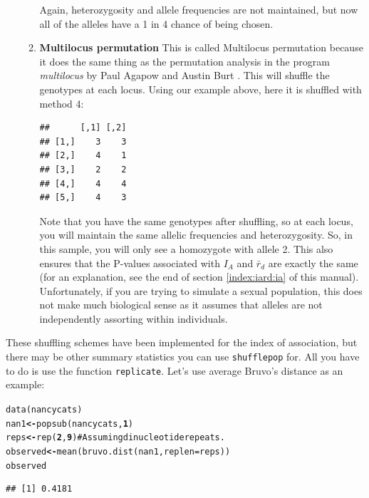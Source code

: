 \documentclass[letterpaper]{article}\usepackage[]{graphicx}\usepackage[]{color}
\makeatletter
\newcommand{\hlnum}[1]{\textcolor[rgb]{0.502,0,0.502}{\textbf{#1}}}%
\newcommand{\hlcom}[1]{\textcolor[rgb]{1,0.502,0}{#1}}%
\newcommand{\hlstd}[1]{\textcolor[rgb]{0,0,0}{#1}}%
\newcommand{\hlkwb}[1]{\textcolor[rgb]{0.502,0.502,0.753}{\textbf{#1}}}%
\newcommand{\hlkwc}[1]{\textcolor[rgb]{0,0.502,0.753}{#1}}%
\newcommand{\hlkwd}[1]{\textcolor[rgb]{0,0.267,0.4}{#1}}%
\newenvironment{kframe}{%
 \def\at@end@of@kframe{}%
 \ifinner\ifhmode%
  \def\at@end@of@kframe{\end{minipage}}%
  \begin{minipage}{\columnwidth}%
 \fi\fi%
 \def\FrameCommand##1{\hskip\@totalleftmargin \hskip-\fboxsep
 \colorbox{shadecolor}{##1}\hskip-\fboxsep
     \hskip-\linewidth \hskip-\@totalleftmargin \hskip\columnwidth}%
 \MakeFramed {\advance\hsize-\width
   \@totalleftmargin\z@ \linewidth\hsize
   \@setminipage}}%
 {\par\unskip\endMakeFramed%
 \at@end@of@kframe}
\newenvironment{knitrout}{}{} %
\makeatother
\begin{document}
\begin{itemize}
\begin{enumerate}
Again, heterozygosity and allele frequencies are not maintained, but now all of the alleles have a 1 in 4 chance of being chosen.
    \item \textbf{Multilocus permutation} This is called Multilocus permutation because it does the same thing as the permutation analysis in the program \textit{multilocus} by Paul Agapow and Austin Burt \cite{Agapow:2001}. This will shuffle the genotypes at each locus. Using our example above, here it is shuffled with method 4:
\begin{knitrout}\footnotesize
{}\color{fgcolor}\begin{kframe}
\begin{verbatim}
##      [,1] [,2]
## [1,]    3    3
## [2,]    4    1
## [3,]    2    2
## [4,]    4    4
## [5,]    4    3
\end{verbatim}
\end{kframe}
\end{knitrout}


Note that you have the same genotypes after shuffling, so at each locus, you will maintain the same allelic frequencies and heterozygosity. So, in this sample, you will only see a homozygote with allele 2. This also ensures that the P-values associated with $I_A$ and $\bar r_d$ are exactly the same (for an explanation, see the end of section \ref{index:iard:ia} of this manual). Unfortunately, if you are trying to simulate a sexual population, this does not make much biological sense as it assumes that alleles are not independently assorting within individuals.
  \end{enumerate}
\end{itemize}
These shuffling schemes have been implemented for the index of association, but there may be other summary statistics you can use \texttt{shufflepop} for. All you have to do is use the function \texttt{replicate}. Let's use average Bruvo's
distance as an example:
\begin{knitrout}\footnotesize
{}\color{fgcolor}\begin{kframe}
\begin{alltt}
\hlkwd{data}\hlstd{(nancycats)}
\hlstd{nan1} \hlkwb{<-} \hlkwd{popsub}\hlstd{(nancycats,} \hlnum{1}\hlstd{)}
\hlstd{reps} \hlkwb{<-} \hlkwd{rep}\hlstd{(}\hlnum{2}\hlstd{,} \hlnum{9}\hlstd{)}  \hlcom{# Assuming dinucleotide repeats.}
\hlstd{observed} \hlkwb{<-} \hlkwd{mean}\hlstd{(}\hlkwd{bruvo.dist}\hlstd{(nan1,} \hlkwc{replen} \hlstd{= reps))}
\hlstd{observed}
\end{alltt}
\begin{verbatim}
## [1] 0.4181
\end{verbatim}
\end{kframe}
\end{knitrout}
\end{document}
